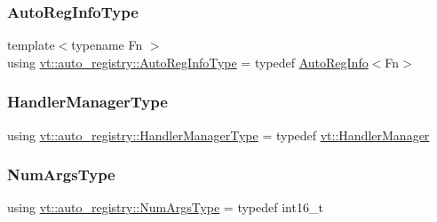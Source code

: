\subsubsection{\texorpdfstring{Auto\+Reg\+Info\+Type}{AutoRegInfoType}}
{\footnotesize\ttfamily template$<$typename Fn $>$ \\
using \hyperlink{namespacevt_1_1auto__registry_af3f78826dd69454aeb914a3c7bec0a52}{vt\+::auto\+\_\+registry\+::\+Auto\+Reg\+Info\+Type} = typedef \hyperlink{structvt_1_1auto__registry_1_1_auto_reg_info}{Auto\+Reg\+Info}$<$Fn$>$}

\mbox{\label{namespacevt_1_1auto__registry_a6014637a7590cbfcd2884a23c3e5b576}} 
\subsubsection{\texorpdfstring{Handler\+Manager\+Type}{HandlerManagerType}}
{\footnotesize\ttfamily using \hyperlink{namespacevt_1_1auto__registry_a6014637a7590cbfcd2884a23c3e5b576}{vt\+::auto\+\_\+registry\+::\+Handler\+Manager\+Type} = typedef \hyperlink{structvt_1_1_handler_manager}{vt\+::\+Handler\+Manager}}

\mbox{\label{namespacevt_1_1auto__registry_aebda1d9d765bc9147dc654ad0712c936}} 
\subsubsection{\texorpdfstring{Num\+Args\+Type}{NumArgsType}}
{\footnotesize\ttfamily using \hyperlink{namespacevt_1_1auto__registry_aebda1d9d765bc9147dc654ad0712c936}{vt\+::auto\+\_\+registry\+::\+Num\+Args\+Type} = typedef int16\+\_\+t}

\mbox{\label{namespacevt_1_1auto__registry_a988a4943e4c8fe82b56f5b13bddceb2b}} 
